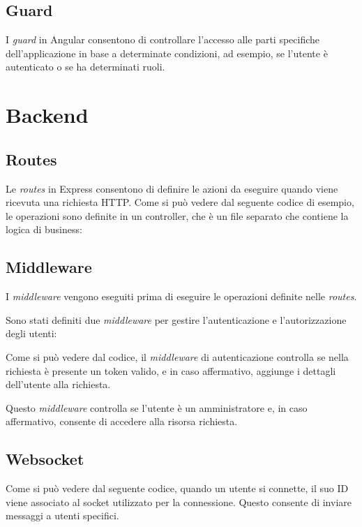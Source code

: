 

\subsection{Guard}

I \textit{guard} in Angular consentono di controllare l'accesso alle parti specifiche dell'applicazione in base a determinate condizioni, ad esempio, se l'utente è autenticato o se ha determinati ruoli.



\section{Backend}

\subsection{Routes}
Le \textit{routes} in Express consentono di definire le azioni da eseguire quando viene ricevuta una richiesta HTTP.
Come si può vedere dal seguente codice di esempio, le operazioni sono definite in un controller, che è un file separato che contiene la logica di business:


\subsection{Middleware}
I \textit{middleware} vengono eseguiti prima di eseguire le operazioni definite nelle \textit{routes}.

Sono stati definiti due \textit{middleware} per gestire l'autenticazione e l'autorizzazione degli utenti:



Come si può vedere dal codice, il \textit{middleware} di autenticazione controlla se nella richiesta è presente un token valido, e in caso affermativo, aggiunge i dettagli dell'utente alla richiesta.



Questo \textit{middleware} controlla se l'utente è un amministratore e, in caso affermativo, consente di accedere alla risorsa richiesta.

\subsection{Websocket}
Come si può vedere dal seguente codice, quando un utente si connette, il suo ID viene associato al socket utilizzato per la connessione. Questo consente di inviare messaggi a utenti specifici.



